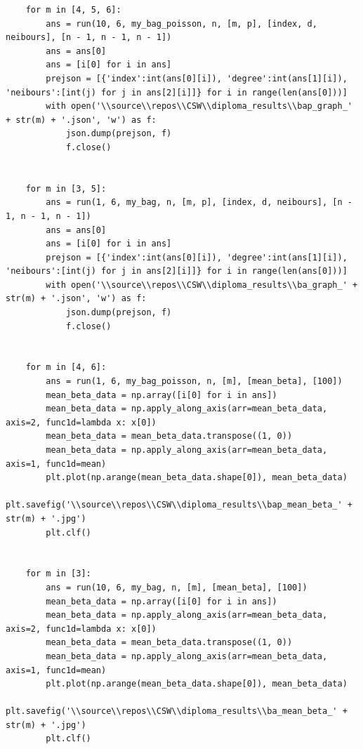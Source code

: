 \documentclass[bachelor, och, diploma]{SCWorks}
\begin{document}
\begin{verbatim}
    for m in [4, 5, 6]:
        ans = run(10, 6, my_bag_poisson, n, [m, p], [index, d, neibours], [n - 1, n - 1, n - 1])
        ans = ans[0]
        ans = [i[0] for i in ans]
        prejson = [{'index':int(ans[0][i]), 'degree':int(ans[1][i]), 'neibours':[int(j) for j in ans[2][i]]} for i in range(len(ans[0]))]
        with open('\\source\\repos\\CSW\\diploma_results\\bap_graph_' + str(m) + '.json', 'w') as f:
            json.dump(prejson, f)
            f.close()
            
    
    for m in [3, 5]:
        ans = run(1, 6, my_bag, n, [m, p], [index, d, neibours], [n - 1, n - 1, n - 1])
        ans = ans[0]
        ans = [i[0] for i in ans]
        prejson = [{'index':int(ans[0][i]), 'degree':int(ans[1][i]), 'neibours':[int(j) for j in ans[2][i]]} for i in range(len(ans[0]))]
        with open('\\source\\repos\\CSW\\diploma_results\\ba_graph_' + str(m) + '.json', 'w') as f:
            json.dump(prejson, f)
            f.close()
            
        
    for m in [4, 6]:
        ans = run(1, 6, my_bag_poisson, n, [m], [mean_beta], [100])
        mean_beta_data = np.array([i[0] for i in ans])
        mean_beta_data = np.apply_along_axis(arr=mean_beta_data, axis=2, func1d=lambda x: x[0])
        mean_beta_data = mean_beta_data.transpose((1, 0))
        mean_beta_data = np.apply_along_axis(arr=mean_beta_data, axis=1, func1d=mean)
        plt.plot(np.arange(mean_beta_data.shape[0]), mean_beta_data)
        plt.savefig('\\source\\repos\\CSW\\diploma_results\\bap_mean_beta_' + str(m) + '.jpg')
        plt.clf()
            
    
    for m in [3]:
        ans = run(10, 6, my_bag, n, [m], [mean_beta], [100])
        mean_beta_data = np.array([i[0] for i in ans])
        mean_beta_data = np.apply_along_axis(arr=mean_beta_data, axis=2, func1d=lambda x: x[0])
        mean_beta_data = mean_beta_data.transpose((1, 0))
        mean_beta_data = np.apply_along_axis(arr=mean_beta_data, axis=1, func1d=mean)
        plt.plot(np.arange(mean_beta_data.shape[0]), mean_beta_data)
        plt.savefig('\\source\\repos\\CSW\\diploma_results\\ba_mean_beta_' + str(m) + '.jpg')
        plt.clf()
\end{verbatim}
\end{document}
